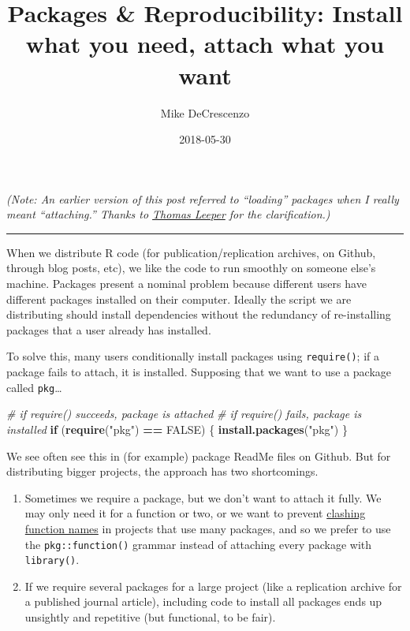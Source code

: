 \documentclass[]{article}
\title{Packages \& Reproducibility: Install what you need, attach what you want}
\author{Mike DeCrescenzo}
\date{2018-05-30}
\newenvironment{Shaded}{\begin{snugshade}}{\end{snugshade}}
\newcommand{\CommentTok}[1]{\textcolor[rgb]{0.56,0.35,0.01}{\textit{#1}}}
\newcommand{\ControlFlowTok}[1]{\textcolor[rgb]{0.13,0.29,0.53}{\textbf{#1}}}
\newcommand{\KeywordTok}[1]{\textcolor[rgb]{0.13,0.29,0.53}{\textbf{#1}}}
\newcommand{\NormalTok}[1]{#1}
\newcommand{\OperatorTok}[1]{\textcolor[rgb]{0.81,0.36,0.00}{\textbf{#1}}}
\newcommand{\OtherTok}[1]{\textcolor[rgb]{0.56,0.35,0.01}{#1}}
\newcommand{\StringTok}[1]{\textcolor[rgb]{0.31,0.60,0.02}{#1}}
\providecommand{\tightlist}{%
  \setlength{\itemsep}{0pt}\setlength{\parskip}{0pt}}
\theoremstyle{definition}
\theoremstyle{definition}
\theoremstyle{definition}
\theoremstyle{remark}
\begin{document}
\maketitle

{
\setcounter{tocdepth}{2}
\tableofcontents
}
\emph{(Note: An earlier version of this post referred to ``loading''
packages when I really meant ``attaching.'' Thanks to
\href{https://twitter.com/thosjleeper/status/1001859564113924096}{Thomas
Leeper} for the clarification.)}

\begin{center}\rule{0.5\linewidth}{\linethickness}\end{center}

When we distribute R code (for publication/replication archives, on
Github, through blog posts, etc), we like the code to run smoothly on
someone else's machine. Packages present a nominal problem because
different users have different packages installed on their computer.
Ideally the script we are distributing should install dependencies
without the redundancy of re-installing packages that a user already has
installed.

To solve this, many users conditionally install packages using
\texttt{require()}; if a package fails to attach, it is installed.
Supposing that we want to use a package called \texttt{pkg}\ldots{}

\begin{Shaded}
\begin{Highlighting}[]
\CommentTok{# if require() succeeds, package is attached}
\CommentTok{# if require() fails, package is installed}
\ControlFlowTok{if}\NormalTok{ (}\KeywordTok{require}\NormalTok{(}\StringTok{"pkg"}\NormalTok{) }\OperatorTok{==}\StringTok{ }\OtherTok{FALSE}\NormalTok{) \{}
  \KeywordTok{install.packages}\NormalTok{(}\StringTok{"pkg"}\NormalTok{)}
\NormalTok{\}}
\end{Highlighting}
\end{Shaded}

We see often see this in (for example) package ReadMe files on Github.
But for distributing bigger projects, the approach has two shortcomings.

\begin{enumerate}
\def\labelenumi{\arabic{enumi}.}
\tightlist
\item
  Sometimes we require a package, but we don't want to attach it fully.
  We may only need it for a function or two, or we want to prevent
  \href{https://github.com/r-lib/conflicted}{clashing function names} in
  projects that use many packages, and so we prefer to use the
  \texttt{pkg::function()} grammar instead of attaching every package
  with \texttt{library()}.
\item
  If we require several packages for a large project (like a replication
  archive for a published journal article), including code to install
  all packages ends up unsightly and repetitive (but functional, to be
  fair).
\end{enumerate}
\end{document}

